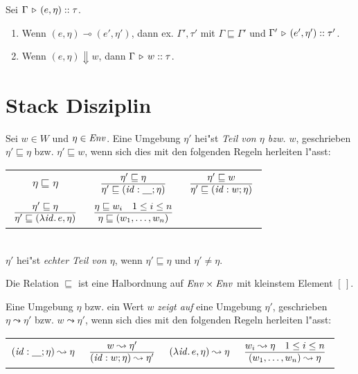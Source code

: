 \documentclass[12pt,fleqn,a4paper]{article}
\begin{document}
\begin{lemma}
  Sei $\Gamma \, \triangleright \, (e,\eta)\mathrel{::}\tau$.
  \begin{enumerate}
  \item Wenn $(e,\eta) \multimap (e',\eta')$, dann ex. $\Gamma',\tau'$ mit $\Gamma \sqsubseteq \Gamma'$
    und $\Gamma' \, \triangleright \, (e',\eta')\mathrel{::}\tau'$.
  \item Wenn $(e,\eta) \Downarrow w$, dann $\Gamma \, \triangleright \, w\mathrel{::}\tau$.
  \end{enumerate}
\end{lemma}


\section{Stack Disziplin}

\begin{definition}
  Sei $w \in W$ und $\eta \in {\text{\it Env\/}}$. Eine Umgebung $\eta'$ hei"st \emph{Teil von $\eta$ bzw. $w$},
  geschrieben $\eta' \sqsubseteq \eta$ bzw. $\eta' \sqsubseteq w$, wenn sich dies mit den folgenden
  Regeln herleiten l"asst: \\[5mm]
  \begin{tabular}{ccc}
    $\eta \sqsubseteq \eta$
    & $\regel{\eta' \sqsubseteq \eta}{\eta' \sqsubseteq (\id:\underline{\quad};\eta)}$
    & $\regel{\eta' \sqsubseteq w}{\eta' \sqsubseteq (\id:w;\eta)}$ \\[3mm]
    $\regel{\eta' \sqsubseteq \eta}{\eta' \sqsubseteq (\abstr{\id}{e},\eta)}$
    & $\regel{\eta \sqsubseteq w_i \quad 1 \le i \le n}{\eta \sqsubseteq (w_1,\ldots,w_n)}$ \\[3mm]
  \end{tabular} \\[2mm]
  $\eta'$ hei"st \emph{echter Teil von $\eta$}, wenn $\eta' \sqsubseteq \eta$ und $\eta' \ne \eta$.
\end{definition}

\begin{lemma}
  Die Relation $\sqsubseteq$ ist eine Halbordnung auf ${\text{\it Env\/}} \times {\text{\it Env\/}}$ mit kleinstem Element $[\,]$.
\end{lemma}

\begin{definition}
  Eine Umgebung $\eta$ bzw. ein Wert $w$ \emph{zeigt auf} eine Umgebung $\eta'$, geschrieben $\eta \leadsto \eta'$
  bzw. $w \leadsto \eta'$, wenn sich dies mit den folgenden Regeln herleiten l"asst: \\[5mm]
  \begin{tabular}{cccc}
    $({\text{\it id\/}}:\underline{\quad};\eta) \leadsto \eta$
    & $\regel{w \leadsto \eta'}{(\id:w;\eta) \leadsto \eta'}$ 
    & $(\lambda {\text{\it id\/}}.\,e,\eta) \leadsto \eta$
    & $\regel{w_i \leadsto \eta \quad 1 \le i \le n}{(w_1,\ldots,w_n) \leadsto \eta}$ \\[3mm]
  \end{tabular}
\end{definition}
\end{document}
